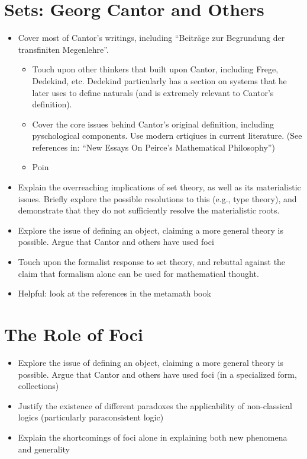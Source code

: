 \section{Sets: Georg Cantor and Others}
\begin{itemize}
  \item Cover most of Cantor's writings, including ``Beiträge zur Begrundung der transfiniten Megenlehre''.
        \begin{itemize}

          \item Touch upon other thinkers that built upon Cantor, including Frege, Dedekind, etc. Dedekind particularly has a section on systems that he later uses to define naturals (and is extremely relevant to Cantor's definition).

          \item Cover the core issues behind Cantor's original definition, including pyschological components. Use modern crtiqiues in current literature. (See references in: ``New Essays On Peirce's Mathematical Philosophy'')

          \item Poin
          
                \end{itemize}
  \item Explain the overreaching implications of set theory, as well as its materialistic issues. Briefly explore the possible resolutions to this (e.g., type theory), and demonstrate that they do not sufficiently resolve the materialistic roots.
  \item Explore the issue of defining an object, claiming a more general theory is possible. Argue that Cantor and others have used foci

  \item Touch upon the formalist response to set theory, and rebuttal against the claim that formalism alone can be used for mathematical thought.
  \item Helpful: look at the references in the metamath book
\end{itemize}



\section{The Role of Foci}
\begin{itemize}
  \item Explore the issue of defining an object, claiming a more general theory is possible. Argue that Cantor and others have used foci (in a specialized form, collections)
  \item Justify the existence of different paradoxes the applicability of non-classical logics (particularly paraconsistent logic)
  \item Explain the shortcomings of foci alone in explaining both new phenomena and generality
\end{itemize}


